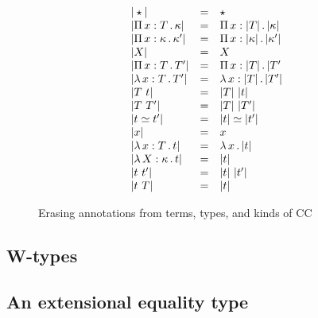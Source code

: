 \documentclass{article}
\begin{document}
\begin{figure}
  \[
  \begin{array}{lll}
    |\star| & = & \star \\
    |\Pi\, x: T\, .\, \kappa| & = & \Pi\, x: |T|\, .\, |\kappa| \\
    |\Pi\, x: \kappa\, .\, \kappa'| & = & \Pi\, x: |\kappa|\, .\, |\kappa'| \\
    |X| & = & X \\
    |\Pi\, x: T\, .\, T'| & = & \Pi\, x: |T|\, .\, |T' \\
    |\lambda\, x : T\, .\, T'| & = & \lambda\, x : |T|\, .\, |T'| \\
    |T\ t| & = & |T|\ |t| \\
    |T\ T'| & = & |T|\ |T'| \\
    |t \simeq t'| & = & |t| \simeq |t'| \\
    |x| & = & x \\
    |\lambda\, x : T\, .\, t| & = & \lambda\, x\, .\, |t| \\
    |\lambda\, X : \kappa\, .\, t| & = & |t| \\
    |t\ t'| & = & |t|\ |t'| \\
    |t\ T| & = & |t| 
  \end{array}
  \]
  \caption{Erasing annotations from terms, types, and kinds of CC}
  \label{fig:erase}
\end{figure}


\subsection{W-types}


\subsection{An extensional equality type}
\end{document}
